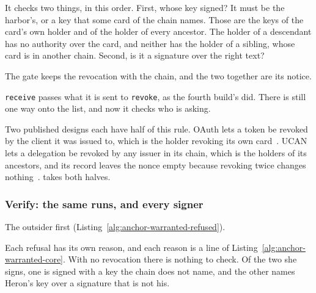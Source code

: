 It checks two things, in this order. First, whose key signed? It must be
the harbor's, or a key that some card of the chain names. Those are the keys
of the card's own holder and of the holder of every ancestor. The holder of
a descendant has no authority over the card, and neither has the holder of
a sibling, whose card is in another chain. Second, is it a signature over
the right text?

The gate keeps the revocation with the chain, and the two together are its
notice.


\texttt{receive} passes what it is sent to \texttt{revoke}, as the fourth
build's did. There is still one way onto the list, and now it checks who is
asking.

\pagebreak[0]

Two published designs each have half of this rule. OAuth lets a token be
revoked by the client it was issued to, which is the holder revoking its own
card~. UCAN lets a delegation be revoked by
any issuer in its chain, which is the holders of its ancestors, and its
record leaves the nonce empty because revoking twice changes
nothing~. \pdkernelname{} takes both halves.

\subsubsection{Verify: the same runs, and every signer}

The outsider first (Listing~\ref{alg:anchor-warranted-refused}).


Each refusal has its own reason, and each reason is a line of
Listing~\ref{alg:anchor-warranted-core}. With no revocation there is nothing
to check. Of the two she signs, one is signed with a key the chain does not
name, and the other names Heron's key over a signature that is not his.

